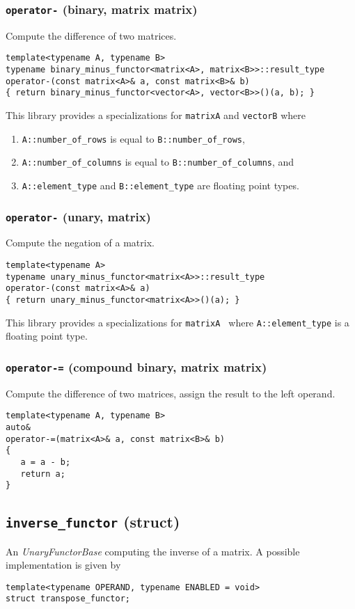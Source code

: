 \documentclass[oneside]{book}
\begin{document}
\subsubsection{\texttt{operator-} (binary, matrix matrix)}
Compute the difference of two matrices.
\begin{verbatim}
template<typename A, typename B>
typename binary_minus_functor<matrix<A>, matrix<B>>::result_type
operator-(const matrix<A>& a, const matrix<B>& b)
{ return binary_minus_functor<vector<A>, vector<B>>()(a, b); }
\end{verbatim}
This library provides a specializations for \texttt{matrix\textlangle A\textrangle}
and \texttt{vector\textlangle B\textrangle} where
\begin{enumerate}
	\item \texttt{A::number\_of\_rows} is equal to \texttt{B::number\_of\_rows},
	\item \texttt{A::number\_of\_columns} is equal to \texttt{B::number\_of\_columns}, and
	\item \texttt{A::element\_type} and \texttt{B::element\_type} are floating point types.
\end{enumerate}

\subsubsection{\texttt{operator-} (unary, matrix)}
Compute the negation of a matrix.
\begin{verbatim}
template<typename A>
typename unary_minus_functor<matrix<A>>::result_type
operator-(const matrix<A>& a)
{ return unary_minus_functor<matrix<A>>()(a); }
\end{verbatim}
This library provides a specializations for \texttt{matrix\textlangle A
\textrangle} where  \texttt{A::element\_type} is a floating point type.

\subsubsection{\texttt{operator-=} (compound binary, matrix matrix)}
Compute the difference of two matrices, assign the result to the left operand.
\begin{verbatim}
template<typename A, typename B>
auto&
operator-=(matrix<A>& a, const matrix<B>& b)
{
   a = a - b;
   return a;
}
\end{verbatim}

\subsection{\texttt{inverse\_functor} (struct)}
An \textit{UnaryFunctorBase} computing the inverse of a matrix.
A possible implementation is given by
\begin{verbatim}
template<typename OPERAND, typename ENABLED = void>
struct transpose_functor;
\end{verbatim}
\end{document}
